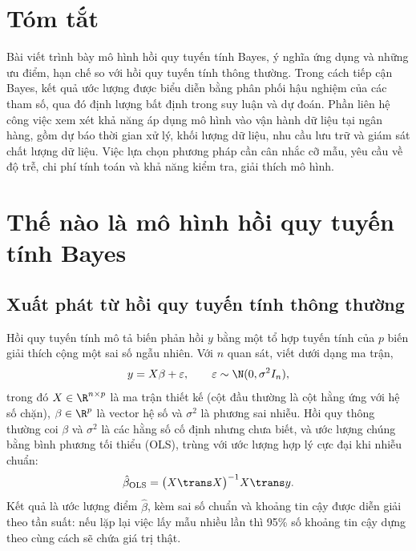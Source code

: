 \documentclass[12pt,a4paper]{report}
\begin{document}
\makereporttitlepage

\chapter*{Tóm tắt}

Bài viết trình bày mô hình hồi quy tuyến tính Bayes, ý nghĩa ứng dụng và
những ưu điểm, hạn chế so với hồi quy tuyến tính thông thường. Trong cách tiếp
cận Bayes, kết quả ước lượng được biểu diễn bằng phân phối hậu nghiệm của các
tham số, qua đó định lượng bất định trong suy luận và dự đoán. Phần liên hệ công
việc xem xét khả năng áp dụng mô hình vào vận hành dữ liệu tại ngân hàng, gồm
dự báo thời gian xử lý, khối lượng dữ liệu, nhu cầu lưu trữ và giám sát chất
lượng dữ liệu. Việc lựa chọn phương pháp cần cân nhắc cỡ mẫu, yêu cầu về độ trễ,
chi phí tính toán và khả năng kiểm tra, giải thích mô hình.

\tableofcontents
\pagebreak

\listoftables
\newpage

\chapter{Thế nào là mô hình hồi quy tuyến tính Bayes}
\label{sec:what}

\section{Xuất phát từ hồi quy tuyến tính thông thường}

Hồi quy tuyến tính mô tả biến phản hồi $y$ bằng một tổ hợp tuyến tính của $p$
biến giải thích cộng một sai số ngẫu nhiên. Với $n$ quan sát, viết dưới dạng ma
trận,
%
\begin{equation}
  \label{eq:linreg}
  y = X\beta + \varepsilon, \qquad \varepsilon \sim \N(0, \sigma^2 I_n),
\end{equation}
%
trong đó $X \in \R^{n \times p}$ là ma trận thiết kế (cột đầu thường là cột
hằng ứng với hệ số chặn), $\beta \in \R^{p}$ là vector hệ số và $\sigma^2$ là
phương sai nhiễu. Hồi quy thông thường coi $\beta$ và $\sigma^2$ là các hằng số
cố định nhưng chưa biết, và ước lượng chúng bằng bình phương tối thiểu (OLS),
trùng với ước lượng hợp lý cực đại khi nhiễu chuẩn:
%
\begin{equation}
  \label{eq:ols}
  \hat\beta_{\text{OLS}} = \bigl(X\trans X\bigr)^{-1} X\trans y .
\end{equation}
%
Kết quả là ước lượng điểm $\hat\beta$, kèm sai số chuẩn và khoảng tin cậy được diễn
giải theo tần suất: nếu lặp lại việc lấy mẫu nhiều lần thì 95\% số khoảng tin
cậy dựng theo cùng cách sẽ chứa giá trị thật.
\end{document}
